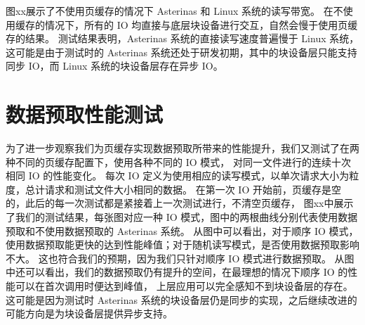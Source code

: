图xx展示了不使用页缓存的情况下 Asterinas 和 Linux 系统的读写带宽。
在不使用缓存的情况下，所有的 IO 均直接与底层块设备进行交互，自然会慢于使用页缓存的结果。
测试结果表明，Asterinas 系统的直接读写速度普遍慢于 Linux 系统，
这可能是由于测试时的 Asterinas 系统还处于研发初期，其中的块设备层只能支持同步 IO，而 Linux 系统的块设备层存在异步 IO。

\section{数据预取性能测试}

为了进一步观察我们为页缓存实现数据预取所带来的性能提升，我们又测试了在两种不同的页缓存配置下，使用各种不同的 IO 模式，
对同一文件进行的连续十次相同 IO 的性能变化。
每次 IO 定义为使用相应的读写模式，以单次请求大小为粒度，总计请求和测试文件大小相同的数据。
在第一次 IO 开始前，页缓存是空的，此后的每一次测试都是紧接着上一次测试进行，不清空页缓存，
图xx中展示了我们的测试结果，每张图对应一种 IO 模式，图中的两根曲线分别代表使用数据预取和不使用数据预取的 Asterinas 系统。
从图中可以看出，对于顺序 IO 模式，使用数据预取能更快的达到性能峰值；对于随机读写模式，是否使用数据预取影响不大。
这也符合我们的预期，因为我们只针对顺序 IO 模式进行数据预取。
从图中还可以看出，我们的数据预取仍有提升的空间，在最理想的情况下顺序 IO 的性能可以在首次调用时便达到峰值，
上层应用可以完全感知不到块设备层的存在。
这可能是因为测试时 Asterinas 系统的块设备层仍是同步的实现，之后继续改进的可能方向是为块设备层提供异步支持。
